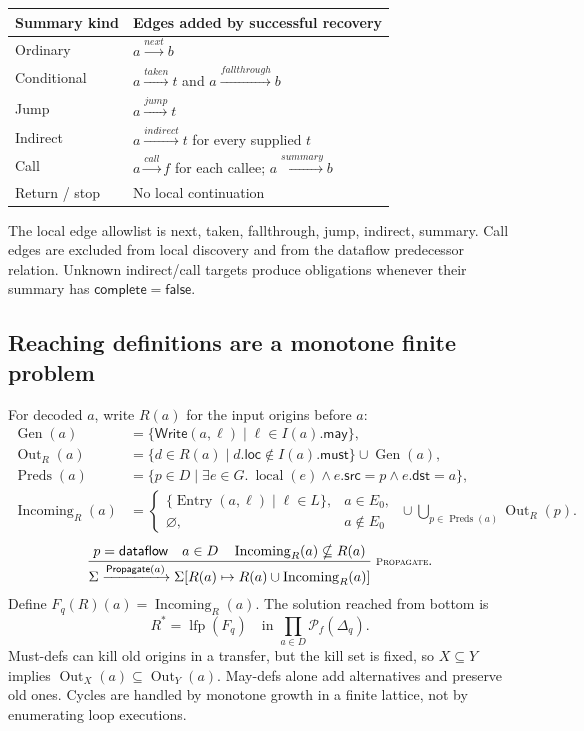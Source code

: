 \documentclass[11pt,a4paper]{article}
\newcommand{\ty}[1]{\mathsf{#1}}
\newcommand{\fin}{\mathcal{P}_{\!f}}
\newcommand{\lfp}{\operatorname{lfp}}
\newcommand{\out}{\operatorname{Out}}
\newcommand{\incoming}{\operatorname{Incoming}}
\newcommand{\preds}{\operatorname{Preds}}
\newcommand{\gen}{\operatorname{Gen}}
\newcommand{\ent}{\operatorname{Entry}}
\newcommand{\local}{\operatorname{local}}
\newcommand{\rulelabel}[1]{\text{\scriptsize\textsc{#1}}}
\begin{document}
\begin{center}
\begin{tabular}{@{}ll@{}}\toprule
Summary kind & Edges added by successful recovery\\\midrule
Ordinary & $a\xrightarrow{next}b$\\
Conditional & $a\xrightarrow{taken}t$ and $a\xrightarrow{fallthrough}b$\\
Jump & $a\xrightarrow{jump}t$\\
Indirect & $a\xrightarrow{indirect}t$ for every supplied $t$\\
Call & $a\xrightarrow{call}f$ for each callee; $a\xrightarrow{summary}b$\\
Return / stop & No local continuation\\\bottomrule
\end{tabular}
\end{center}
The local edge allowlist is next, taken, fallthrough, jump, indirect, summary.
Call edges are excluded from local discovery and from the dataflow predecessor
relation. Unknown indirect/call targets produce obligations whenever their
summary has $\ty{complete}=\ty{false}$.

\subsection{Reaching definitions are a monotone finite problem}
For decoded $a$, write $R(a)$ for the input origins before $a$:
\begin{align*}
 \gen(a)&=\{\ty{Write}(a,\ell)\mid\ell\in I(a).\ty{may}\},\\
 \out_R(a)&=\{d\in R(a)\mid d.\ty{loc}\notin I(a).\ty{must}\}\cup\gen(a),\\
 \preds(a)&=\{p\in D\mid\exists e\in G.\ \local(e)\land e.\ty{src}=p\land e.\ty{dst}=a\},\\
 \incoming_R(a)&=
 \begin{cases}\{\ent(a,\ell)\mid\ell\in L\},&a\in E_0,\\
 \varnothing,&a\notin E_0
 \end{cases}
 \ \cup\!\bigcup_{p\in\preds(a)}\out_R(p).
\end{align*}
\[
\frac{p=\ty{dataflow}\quad a\in D\quad\incoming_R(a)\nsubseteq R(a)}
 {\Sigma\xrightarrow{\ty{Propagate}(a)}
  \Sigma[R(a)\mapsto R(a)\cup\incoming_R(a)]}
 \;\rulelabel{Propagate}.
\]
Define $F_q(R)(a)=\incoming_R(a)$. The solution reached from bottom is
\[
 R^*=\lfp(F_q)\quad\text{in }\prod_{a\in D}\fin(\Delta_q).
\]
Must-defs can kill old origins in a transfer, but the kill set is fixed, so
$X\subseteq Y$ implies $\out_X(a)\subseteq\out_Y(a)$.
May-defs alone add alternatives and preserve old ones. Cycles are handled by
monotone growth in a finite lattice, not by enumerating loop executions.
\end{document}
